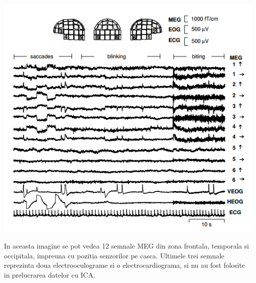 \documentclass[12pt,oneside]{article}
\begin{document}
\begin{center}
	\includegraphics[scale=1]{meg_1}
 \end{center}
 In aceasta imagine\cite{hyvarien} se pot vedea 12 semnale MEG din zona frontala, temporala si occipitala, impreuna cu pozitia senzorilor pe casca. Ultimele trei semnale reprezinta doua electrooculograme si o electrocardiograma, si nu au fost folosite in prelucrarea datelor cu ICA.
\end{document}
